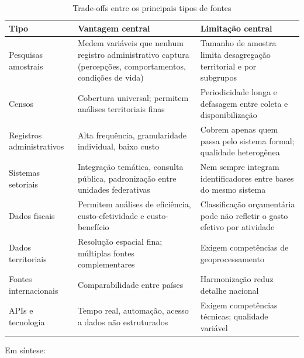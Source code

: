 \begin{table}[H]
\centering
\caption{Trade-offs entre os principais tipos de fontes}
\label{tab:tradeoffs_tipos}
\small
\begin{tabularx}{\textwidth}{@{} >{\raggedright\arraybackslash}p{3.2cm} X X @{}}
\toprule
\textbf{Tipo} & \textbf{Vantagem central} & \textbf{Limitação central} \\
\midrule
Pesquisas amostrais     & Medem variáveis que nenhum registro administrativo captura (percepções, comportamentos, condições de vida) & Tamanho de amostra limita desagregação territorial e por subgrupos \\
Censos                  & Cobertura universal; permitem análises territoriais finas                                                  & Periodicidade longa e defasagem entre coleta e disponibilização \\
Registros administrativos & Alta frequência, granularidade individual, baixo custo                                                    & Cobrem apenas quem passa pelo sistema formal; qualidade heterogênea \\
Sistemas setoriais      & Integração temática, consulta pública, padronização entre unidades federativas                            & Nem sempre integram identificadores entre bases do mesmo sistema \\
Dados fiscais           & Permitem análises de eficiência, custo-efetividade e custo-benefício                                       & Classificação orçamentária pode não refletir o gasto efetivo por atividade \\
Dados territoriais      & Resolução espacial fina; múltiplas fontes complementares                                                    & Exigem competências de geoprocessamento \\
Fontes internacionais   & Comparabilidade entre países                                                                                & Harmonização reduz detalhe nacional \\
APIs e tecnologia       & Tempo real, automação, acesso a dados não estruturados                                                      & Exigem competências técnicas; qualidade variável \\
\bottomrule
\end{tabularx}
\end{table}

\noindent Em síntese:

